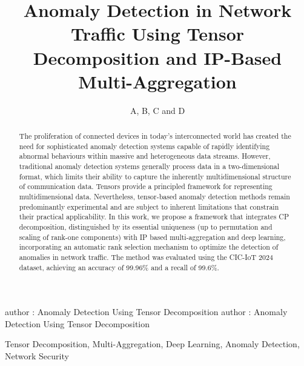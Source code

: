 \documentclass{ieeeaccess}
\begin{document}

\title{Anomaly Detection in Network Traffic Using Tensor Decomposition and IP-Based Multi-Aggregation}
\author{\uppercase{a}, \uppercase{b}, \uppercase{c} and \uppercase{d}
\address[1]{
Universities, Email: \texttt{mails}}
}

\markboth
{author \headeretal: Anomaly Detection Using Tensor Decomposition}
{author \headeretal: Anomaly Detection Using Tensor Decomposition}



\begin{abstract}
The proliferation of connected devices in today's interconnected world has created the need for sophisticated anomaly detection systems capable of rapidly identifying abnormal behaviours within massive and heterogeneous data streams. However, traditional anomaly detection systems generally process data in a two-dimensional format, which limits their ability to capture the inherently multidimensional structure of communication data. Tensors provide a principled framework for representing multidimensional data. Nevertheless, tensor-based anomaly detection methods remain predominantly experimental and are subject to inherent limitations that constrain their practical applicability. In this work, we propose a framework that integrates CP decomposition, distinguished by its essential uniqueness (up to permutation and scaling of rank-one components) with IP based multi-aggregation and deep learning, incorporating an automatic rank selection mechanism to optimize the detection of anomalies in network traffic. The method was evaluated using the CIC-IoT 2024 dataset, achieving an accuracy of 99.96\% and a recall of 99.6\%.
\end{abstract}

\begin{keywords}
Tensor Decomposition, Multi-Aggregation, Deep Learning, Anomaly Detection, Network Security
\end{keywords}

\titlepgskip=-15pt

\maketitle
\end{document}
